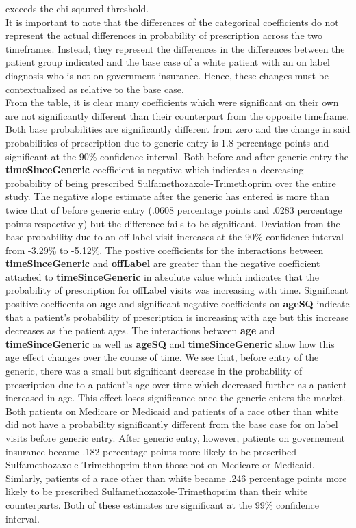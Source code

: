 exceeds the chi sqaured threshold.\\
\indent It is important to note that the differences of the categorical coefficients do not represent the actual differences in probability of prescription across the two timeframes. Instead, they represent the differences in the differences between the patient group indicated and the base case of a white patient with an on label diagnosis who is not on government insurance. Hence, these changes must be contextualized as relative to the base case.\\
\indent From the table, it is clear many coefficients which were significant on their own are not significantly different than their counterpart from the opposite timeframe. Both base probabilities are significantly different from zero and the change in said probabilities of prescription due to generic entry is 1.8 percentage points and significant at the 90\% confidence interval. Both before and after generic entry the \textbf{timeSinceGeneric} coefficient is negative which indicates a decreasing probability of being prescribed Sulfamethozaxole-Trimethoprim over the entire study. The negative slope estimate after the generic has entered is more than twice that of before generic entry (.0608 percentage points and .0283 percentage points respectively) but the difference fails to be significant. Deviation from the base probability due to an off label visit increases at the 90\% confidence interval from -3.29\% to -5.12\%. The postive coefficients for the interactions between \textbf{timeSinceGeneric} and \textbf{offLabel} are greater than the negative coefficient attached to \textbf{timeSinceGeneric} in absolute value which indicates that the probability of prescription for offLabel visits was increasing with time. Significant positive coefficents on \textbf{age} and significant negative coefficients on \textbf{ageSQ} indicate that a patient's probability of prescription is increasing with age but this increase decreases as the patient ages. The interactions between \textbf{age} and \textbf{timeSinceGeneric} as well as \textbf{ageSQ} and \textbf{timeSinceGeneric} show how this age effect changes over the course of time. We see that, before entry of the generic, there was a small but significant decrease in the probability of prescription due to a patient's age over time which decreased further as a patient increased in age. This effect loses significance once the generic enters the market.\\
\indent Both patients on Medicare or Medicaid and patients of a race other than white did not have a probability significantly different from the base case for on label visits before generic entry. After generic entry, however, patients on governement insurance became .182 percentage points more likely to be prescribed Sulfamethozaxole-Trimethoprim than those not on Medicare or Medicaid. Simlarly, patients of a race other than white became .246 percentage points more likely to be prescribed Sulfamethozaxole-Trimethoprim than their white counterparts. Both of these estimates are significant at the 99\% confidence interval. 



